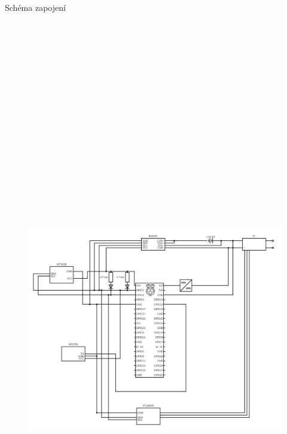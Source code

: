 \documentclass[final]{beamer}
\newlength{\colwidth}
\begin{document}
\begin{frame}[t]
\begin{columns}[t]
\begin{column}{\colwidth}
\begin{block}{Schéma zapojení}
				\begin{figure}[h]
					\centering
					\includegraphics[height=27cm]{./schema.png}
				\end{figure}



\end{block}
\end{column}
\end{columns}
\end{frame}
\end{document}
